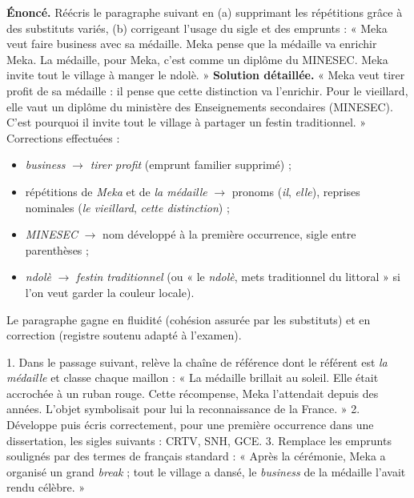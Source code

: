 \documentclass[11pt]{article}
\newcounter{popsec}
\newcounter{popsub}
\newcommand{\courssub}[1]{%
  \stepcounter{popsub}%
  \par\vspace{9pt}\noindent{\popxbold\fontsize{11.5}{13}\selectfont\color{popink}{\color{poporange}\thepopsec.\thepopsub}\hspace{6pt}#1}\par\nopagebreak\vspace{4pt}
}
\begin{document}
\courssub{Application : réécrire un paragraphe}

\begin{exoresolu}
\textbf{Énoncé.} Réécris le paragraphe suivant en (a) supprimant les répétitions grâce à des substituts variés, (b) corrigeant l'usage du sigle et des emprunts : « Meka veut faire business avec sa médaille. Meka pense que la médaille va enrichir Meka. La médaille, pour Meka, c'est comme un diplôme du MINESEC. Meka invite tout le village à manger le ndolè. »
\tcblower
\textbf{Solution détaillée.} « Meka veut tirer profit de sa médaille : il pense que cette distinction va l'enrichir. Pour le vieillard, elle vaut un diplôme du ministère des Enseignements secondaires (MINESEC). C'est pourquoi il invite tout le village à partager un festin traditionnel. »
Corrections effectuées :
\begin{itemize}
\item \emph{business} $\rightarrow$ \emph{tirer profit} (emprunt familier supprimé) ;
\item répétitions de \emph{Meka} et de \emph{la médaille} $\rightarrow$ pronoms (\emph{il}, \emph{elle}), reprises nominales (\emph{le vieillard}, \emph{cette distinction}) ;
\item \emph{MINESEC} $\rightarrow$ nom développé à la première occurrence, sigle entre parenthèses ;
\item \emph{ndolè} $\rightarrow$ \emph{festin traditionnel} (ou « le \emph{ndolè}, mets traditionnel du littoral » si l'on veut garder la couleur locale).
\end{itemize}
Le paragraphe gagne en fluidité (cohésion assurée par les substituts) et en correction (registre soutenu adapté à l'examen).
\end{exoresolu}

\begin{exercice}
1. Dans le passage suivant, relève la chaîne de référence dont le référent est \emph{la médaille} et classe chaque maillon : « La médaille brillait au soleil. Elle était accrochée à un ruban rouge. Cette récompense, Meka l'attendait depuis des années. L'objet symbolisait pour lui la reconnaissance de la France. »
2. Développe puis écris correctement, pour une première occurrence dans une dissertation, les sigles suivants : CRTV, SNH, GCE.
3. Remplace les emprunts soulignés par des termes de français standard : « Après la cérémonie, Meka a organisé un grand \emph{break} ; tout le village a dansé, le \emph{business} de la médaille l'avait rendu célèbre. »
\end{exercice}
\end{document}
